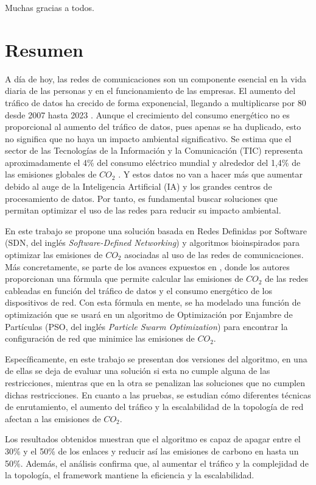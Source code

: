 \documentclass[minitoc, hidelinks, headlogo, framedcover]{tfeEPCC}
\begin{document}
Muchas gracias a todos.

\chapter*{Resumen}
A día de hoy, las redes de comunicaciones son un componente esencial en la vida diaria de las personas y en el funcionamiento de las empresas. El aumento del tráfico de datos ha crecido de forma exponencial, llegando a multiplicarse por 80 desde 2007 hasta 2023 \cite{Paska2025}. Aunque el crecimiento del consumo energético no es proporcional al aumento del tráfico de datos, pues apenas se ha duplicado, esto no significa que no haya un impacto ambiental significativo. Se estima que el sector de las Tecnologías de la Información y la Comunicación (TIC) representa aproximadamente el 4\% del consumo eléctrico mundial y alrededor del 1,4\% de las emisiones globales de $CO_2$ \cite{malmodin2024ict}. Y estos datos no van a hacer más que aumentar debido al auge de la Inteligencia Artificial (IA) y los grandes centros de procesamiento de datos. Por tanto, es fundamental buscar soluciones que permitan optimizar el uso de las redes para reducir su impacto ambiental.

En este trabajo se propone una solución basada en Redes Definidas por Software (SDN, del inglés \textit{Software-Defined Networking}) y algoritmos bioinspirados para optimizar las emisiones de $CO_2$ asociadas al uso de las redes de comunicaciones. Más concretamente, se parte de los avances expuestos en \cite{ElZahr2023}, donde los autores proporcionan una fórmula que permite calcular las emisiones de $CO_2$ de las redes cableadas en función del tráfico de datos y el consumo energético de los dispositivos de red. Con esta fórmula en mente, se ha modelado una función de optimización que se usará en un algoritmo de Optimización por Enjambre de Partículas (PSO, del inglés \textit{Particle Swarm Optimization}) para encontrar la configuración de red que minimice las emisiones de $CO_2$.

Específicamente, en este trabajo se presentan dos versiones del algoritmo, en una de ellas se deja de evaluar una solución si esta no cumple alguna de las restricciones, mientras que en la otra se penalizan las soluciones que no cumplen dichas restricciones. En cuanto a las pruebas, se estudian cómo diferentes técnicas de enrutamiento, el aumento del tráfico y la escalabilidad de la topología de red afectan a las emisiones de $CO_2$.

Los resultados obtenidos muestran que el algoritmo es capaz de apagar entre el 30\% y el 50\% de los enlaces y reducir así las emisiones de carbono en hasta un 50\%. Además, el análisis confirma que, al aumentar el tráfico y la complejidad de la topología, el framework mantiene la eficiencia y la escalabilidad.
\end{document}
